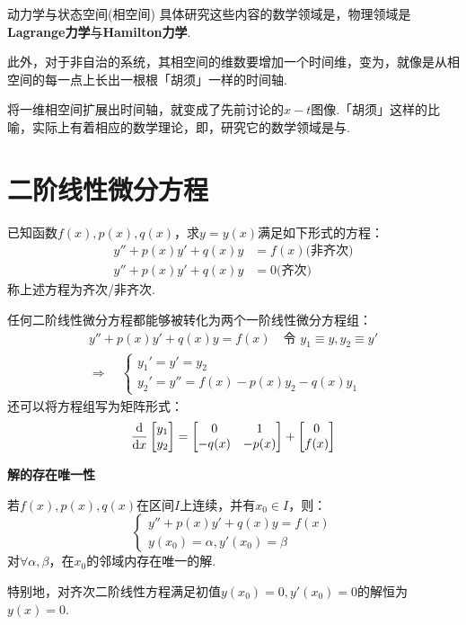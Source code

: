 \begin{extension}{动力学与状态空间(相空间)}
    具体研究这些内容的数学领域是，物理领域是\textbf{Lagrange力学}与\textbf{Hamilton力学}.

    此外，对于非自治的系统，其相空间的维数要增加一个时间维，变为，就像是从相空间的每一点上长出一根根「胡须」一样的时间轴.

    将一维相空间扩展出时间轴，就变成了先前讨论的$x-t$图像.「胡须」这样的比喻，实际上有着相应的数学理论，即，研究它的数学领域是与.
\end{extension}


\section{二阶线性微分方程}
\begin{definition}
    已知函数$f(x),p(x),q(x)$，求$y=y(x)$满足如下形式的方程：
    \begin{align*}
        y'' + p(x)y' + q(x)y &= f(x) \text{(非齐次)} \\
        y'' + p(x)y' + q(x)y &= 0 \text{(齐次)}
    \end{align*}
    称上述方程为齐次/非齐次.
\end{definition}

任何二阶线性微分方程都能够被转化为两个一阶线性微分方程组：
\begin{gather*}
    y'' + p(x)y' + q(x)y = f(x) \quad\text{令}\,\,y_1 \equiv y, y_2 \equiv y'\\
    \Rightarrow\quad \begin{cases}
        y_1' = y' = y_2\\
        y_2' = y'' = f(x) - p(x)y_2 - q(x)y_1
    \end{cases}
\end{gather*}
还可以将方程组写为矩阵形式：
\[\dv{x}\begin{bmatrix}
    y_1 \\ y_2
\end{bmatrix} = \begin{bmatrix}
    0 & 1\\ -q(x) & -p(x)
\end{bmatrix} + \begin{bmatrix}
    0 \\ f(x)
\end{bmatrix}\]

\begin{theorem}
    \label{thm:ExistenceAndUniquenessOfSolutions}
    \textbf{解的存在唯一性}

    若$f(x),p(x),q(x)$在区间$I$上连续，并有$x_0 \in I$，则：
    \[\begin{cases}
        y'' + p(x)y' + q(x)y = f(x)\\
        y(x_0) = \alpha, y'(x_0) = \beta
    \end{cases}\]
    对$\forall \alpha,\beta$，在$x_0$的邻域内存在唯一的解.

    特别地，对齐次二阶线性方程满足初值$y(x_0)=0,y'(x_0)=0$的解恒为$y(x)=0$.
\end{theorem}


